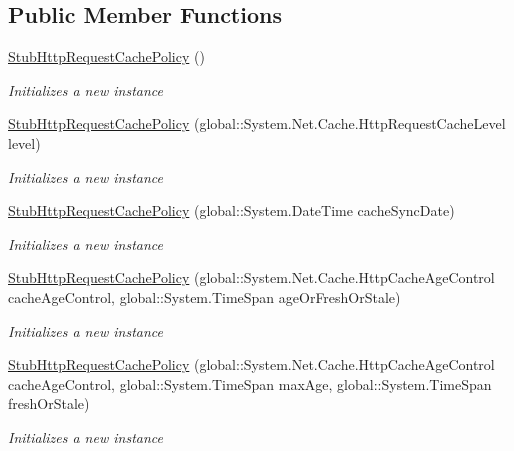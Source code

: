 \subsection*{Public Member Functions}
\begin{DoxyCompactItemize}
\item 
\hyperlink{class_system_1_1_net_1_1_cache_1_1_fakes_1_1_stub_http_request_cache_policy_a5f89d43405ae97320f542489a203bd02}{Stub\-Http\-Request\-Cache\-Policy} ()
\begin{DoxyCompactList}\small\item\em Initializes a new instance\end{DoxyCompactList}\item 
\hyperlink{class_system_1_1_net_1_1_cache_1_1_fakes_1_1_stub_http_request_cache_policy_aad9a1b63a4daaf64d3195fa012731df8}{Stub\-Http\-Request\-Cache\-Policy} (global\-::\-System.\-Net.\-Cache.\-Http\-Request\-Cache\-Level level)
\begin{DoxyCompactList}\small\item\em Initializes a new instance\end{DoxyCompactList}\item 
\hyperlink{class_system_1_1_net_1_1_cache_1_1_fakes_1_1_stub_http_request_cache_policy_ae1c0cb35b05626ae6724d7196b249826}{Stub\-Http\-Request\-Cache\-Policy} (global\-::\-System.\-Date\-Time cache\-Sync\-Date)
\begin{DoxyCompactList}\small\item\em Initializes a new instance\end{DoxyCompactList}\item 
\hyperlink{class_system_1_1_net_1_1_cache_1_1_fakes_1_1_stub_http_request_cache_policy_a7c102331c04e699e88402f86346b2d15}{Stub\-Http\-Request\-Cache\-Policy} (global\-::\-System.\-Net.\-Cache.\-Http\-Cache\-Age\-Control cache\-Age\-Control, global\-::\-System.\-Time\-Span age\-Or\-Fresh\-Or\-Stale)
\begin{DoxyCompactList}\small\item\em Initializes a new instance\end{DoxyCompactList}\item 
\hyperlink{class_system_1_1_net_1_1_cache_1_1_fakes_1_1_stub_http_request_cache_policy_a64a2a6df62c93dd14898c04382cc6fc9}{Stub\-Http\-Request\-Cache\-Policy} (global\-::\-System.\-Net.\-Cache.\-Http\-Cache\-Age\-Control cache\-Age\-Control, global\-::\-System.\-Time\-Span max\-Age, global\-::\-System.\-Time\-Span fresh\-Or\-Stale)
\begin{DoxyCompactList}\small\item\em Initializes a new instance\end{DoxyCompactList}\item 

\end{DoxyCompactItemize}
